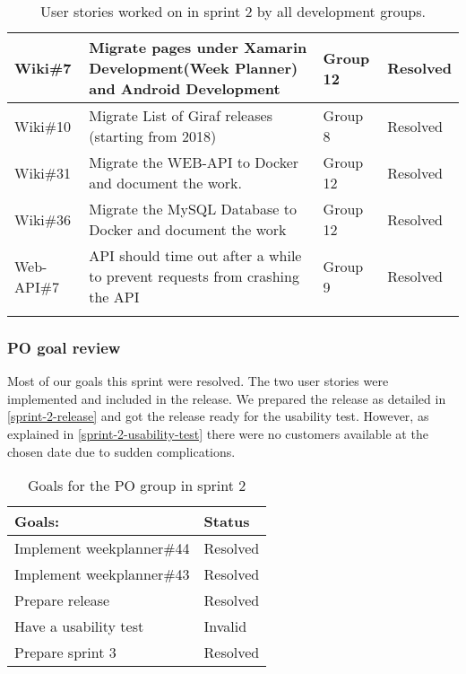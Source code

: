 \begin{longtable}{|p{2.8cm}|p{7cm}|p{1.5cm}|p{1.4cm}|}
    Wiki\#7         & Migrate pages under Xamarin Development(Week Planner) and Android Development                                                                                                            & Group 12        & Resolved    \\ \hline
    Wiki\#10        & Migrate List of Giraf releases (starting from 2018)                                                                                                                                      & Group 8         & Resolved    \\ \hline
    Wiki\#31        & Migrate the WEB-API to Docker and document the work.                                                                                                                                     & Group 12        & Resolved    \\ \hline
    Wiki\#36        & Migrate the MySQL Database to Docker and document the work                                                                                                                               & Group 12        & Resolved    \\ \hline
    Web-API\#7      & API should time out after a while to prevent requests from crashing the API                                                                                                              & Group 9         & Resolved    \\ \hline
    \caption{User stories worked on in sprint 2 by all development groups.}
\end{longtable}

\subsubsection{PO goal review}
Most of our goals this sprint were resolved.
The two user stories were implemented and included in the release. 
We prepared the release as detailed in \autoref{sprint-2-release} and got the release ready for the usability test.
However, as explained in \autoref{sprint-2-usability-test} there were no customers available at the chosen date due to sudden complications.


\begin{table}[H]
    \centering
    \begin{tabular}{|l|l|}
    \hline
    Goals:                                   & Status \\ \hline
    Implement weekplanner\#44                & Resolved  \\ \hline
    Implement weekplanner\#43                & Resolved  \\ \hline
    Prepare release                          & Resolved \\ \hline
    Have a usability test                   & Invalid \\ \hline
    Prepare sprint 3                         & Resolved \\ \hline
    \end{tabular}
    \caption{Goals for the PO group in sprint 2}
    \label{PO-goal-sprint-2-review}
\end{table}
